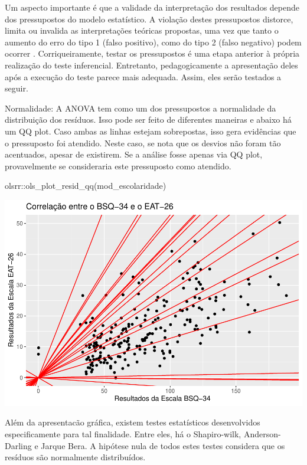 \documentclass[
]{book}
\newenvironment{Shaded}{\begin{snugshade}}{\end{snugshade}}
\newcommand{\FunctionTok}[1]{\textcolor[rgb]{0.00,0.00,0.00}{#1}}
\newcommand{\NormalTok}[1]{#1}
\newcommand{\SpecialCharTok}[1]{\textcolor[rgb]{0.00,0.00,0.00}{#1}}
\begin{document}
Um aspecto importante é que a validade da interpretação dos resultados depende dos pressupostos do modelo estatístico. A violação destes pressupostos distorce, limita ou invalida as interpretações teóricas propostas, uma vez que tanto o aumento do erro do tipo 1 (falso positivo), como do tipo 2 (falso negativo) podem ocorrer \citep{Lix1996, Barker2015, Ernst2017}. Corriqueiramente, testar os pressupostos é uma etapa anterior à própria realização do teste inferencial. Entretanto, pedagogicamente a apresentação deles após a execução do teste parece mais adequada. Assim, eles serão testados a seguir.

Normalidade: A ANOVA tem como um dos pressupostos a normalidade da distribuição dos resíduos. Isso pode ser feito de diferentes maneiras e abaixo há um QQ plot. Caso ambas as linhas estejam sobrepostas, isso gera evidências que o pressuposto foi atendido. Neste caso, se nota que os desvios não foram tão acentuados, apesar de existirem. Se a análise fosse apenas via QQ plot, provavelmente se consideraria este pressuposto como atendido.

\begin{Shaded}
\begin{Highlighting}[]
\NormalTok{olsrr}\SpecialCharTok{::}\FunctionTok{ols\_plot\_resid\_qq}\NormalTok{(mod\_escolaridade)}
\end{Highlighting}
\end{Shaded}

\begin{center}\includegraphics{gitbook-demo_files/figure-latex/unnamed-chunk-81-1} \end{center}

Além da apresentacão gráfica, existem testes estatísticos desenvolvidos especificamente para tal finalidade. Entre eles, há o Shapiro-wilk, Anderson-Darling e Jarque Bera. A hipótese nula de todos estes testes considera que os resíduos são normalmente distribuídos.
\end{document}
